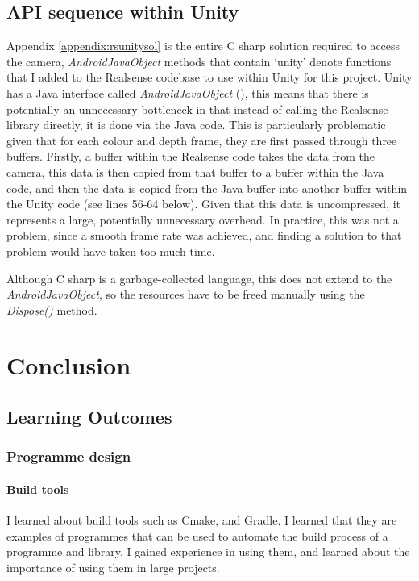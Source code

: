     \subsection{API sequence within Unity}
    Appendix \ref{appendix:rsunitysol} is the entire C sharp solution required to access the camera, {\slshape AndroidJavaObject} methods that contain `unity' denote functions that I added to the Realsense codebase to use within Unity for this project. Unity has a Java interface called {\slshape AndroidJavaObject} (\cite{unityandroidjavaobject}), this means that there is potentially an unnecessary bottleneck in that instead of calling the Realsense library directly, it is done via the Java code. This is particularly problematic given that for each colour and depth frame, they are first passed through three buffers. Firstly, a buffer within the Realsense code takes the data from the camera, this data is then copied from that buffer to a buffer within the Java code, and then the data is copied from the Java buffer into another buffer within the Unity code (see lines 56-64 below). Given that this data is uncompressed, it represents a large, potentially unnecessary overhead. In practice, this was not a problem, since a smooth frame rate was achieved, and finding a solution to that problem would have taken too much time.

    Although C sharp is a garbage-collected language, this does not extend to the {\slshape AndroidJavaObject}, so the resources have to be freed manually using the {\slshape Dispose()} method.
    

\section{Conclusion}
    \subsection{Learning Outcomes}
        \subsubsection{Programme design}
            \paragraph{Build tools}
            I learned about build tools such as Cmake, and Gradle. I learned that they are examples of programmes that can be used to automate the build process of a programme and library. I gained experience in using them, and learned about the importance of using them in large projects.
